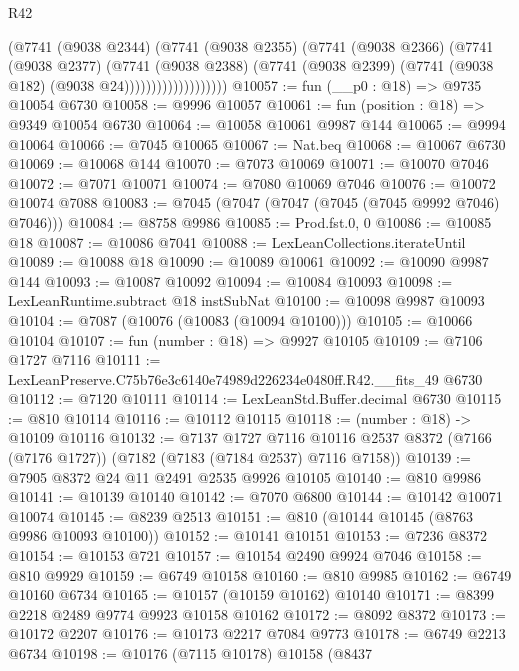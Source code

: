 \begin{lexlean}{R42}
\begin{coremodule}
{                          (@7741
                            (@9038 @2344)
                            (@7741
                              (@9038 @2355)
                              (@7741
                                (@9038 @2366)
                                (@7741
                                  (@9038 @2377)
                                  (@7741
                                    (@9038 @2388)
                                    (@7741
                                      (@9038 @2399)
                                      (@7741 (@9038 @182) (@9038 @24)))))))))))))))))))
@10057 := fun (__p0 : @18) => @9735 @10054 @6730
@10058 := @9996 @10057
@10061 := fun (position : @18) => @9349 @10054 @6730
@10064 := @10058 @10061 @9987 @144
@10065 := @9994 @10064
@10066 := @7045 @10065
@10067 := Nat.beq
@10068 := @10067 @6730
@10069 := @10068 @144
@10070 := @7073 @10069
@10071 := @10070 @7046
@10072 := @7071 @10071
@10074 := @7080 @10069 @7046
@10076 := @10072 @10074 @7088
@10083 := @7045 (@7047 (@7047 (@7045 (@7045 @9992 @7046) @7046)))
@10084 := @8758 @9986
@10085 := Prod.fst.{0, 0}
@10086 := @10085 @18
@10087 := @10086 @7041
@10088 := LexLeanCollections.iterateUntil
@10089 := @10088 @18
@10090 := @10089 @10061
@10092 := @10090 @9987 @144
@10093 := @10087 @10092
@10094 := @10084 @10093
@10098 := LexLeanRuntime.subtract @18 instSubNat
@10100 := @10098 @9987 @10093
@10104 := @7087 (@10076 (@10083 (@10094 @10100)))
@10105 := @10066 @10104
@10107 := fun (number : @18) => @9927 @10105
@10109 := @7106 @1727 @7116
@10111 := LexLeanPreserve.C75b76e3c6140e74989d226234e0480ff.R42.__fits_49 @6730
@10112 := @7120 @10111
@10114 := LexLeanStd.Buffer.decimal @6730
@10115 := @810 @10114
@10116 := @10112 @10115
@10118 := (number : @18) -> @10109 @10116
@10132 := @7137
    @1727
    @7116
    @10116
    @2537
    @8372
    (@7166 (@7176 @1727))
    (@7182 (@7183 (@7184 @2537) @7116 @7158))
@10139 := @7905 @8372 @24 @11 @2491 @2535 @9926 @10105
@10140 := @810 @9986
@10141 := @10139 @10140
@10142 := @7070 @6800
@10144 := @10142 @10071 @10074
@10145 := @8239 @2513
@10151 := @810 (@10144 @10145 (@8763 @9986 @10093 @10100))
@10152 := @10141 @10151
@10153 := @7236 @8372
@10154 := @10153 @721
@10157 := @10154 @2490 @9924 @7046
@10158 := @810 @9929
@10159 := @6749 @10158
@10160 := @810 @9985
@10162 := @6749 @10160 @6734
@10165 := @10157 (@10159 @10162) @10140
@10171 := @8399 @2218 @2489 @9774 @9923 @10158 @10162
@10172 := @8092 @8372
@10173 := @10172 @2207
@10176 := @10173 @2217 @7084 @9773
@10178 := @6749 @2213 @6734
@10198 := @10176
    (@7115 @10178)
    @10158
    (@8437
}
\end{coremodule}
\end{lexlean}
